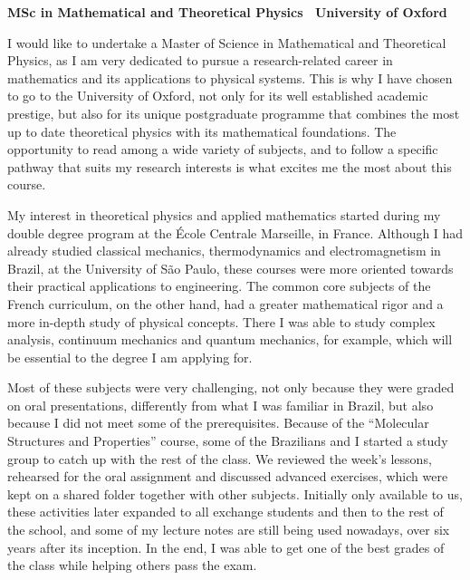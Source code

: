 \documentclass[11pt]{article}
\newcommand*{\NEWLINE}{\vspace{0.75em}}
\begin{document}
\sffamily %

{\bfseries MSc in Mathematical and Theoretical Physics \textemdash~University of Oxford}
\NEWLINE{}\NEWLINE{}


I would like to undertake a Master of Science in Mathematical and Theoretical Physics, as I am very dedicated to pursue a research-related career in mathematics and its applications to physical systems. This is why I have chosen to go to the University of Oxford, not only for its well established academic prestige, but also for its unique postgraduate programme that combines the most up to date theoretical physics with its mathematical foundations. The opportunity to read among a wide variety of subjects, and to follow a specific pathway that suits my research interests is what excites me the most about this course. \NEWLINE{}

My interest in theoretical physics and applied mathematics started during my double degree program at the École Centrale Marseille, in France. Although I had already studied classical mechanics, thermodynamics and electromagnetism in Brazil, at the University of São Paulo, these courses were more oriented towards their practical applications to engineering. The common core subjects of the French curriculum, on the other hand, had a greater mathematical rigor and a more in-depth study of physical concepts. There I was able to study complex analysis, continuum mechanics and quantum mechanics, for example, which will be essential to the degree I am applying for. \NEWLINE{}

Most of these subjects were very challenging, not only because they were graded on oral presentations, differently from what I was familiar in Brazil, but also because I did not meet some of the prerequisites. Because of the ``Molecular Structures and Properties'' course, some of the Brazilians and I started a study group to catch up with the rest of the class. We reviewed the week's lessons, rehearsed for the oral assignment and discussed advanced exercises, which were kept on a shared folder together with other subjects. Initially only available to us, these activities later expanded to all exchange students and then to the rest of the school, and some of my lecture notes are still being used nowadays, over six years after its inception. In the end, I was able to get one of the best grades of the class while helping others pass the exam. \NEWLINE{}
\end{document}
